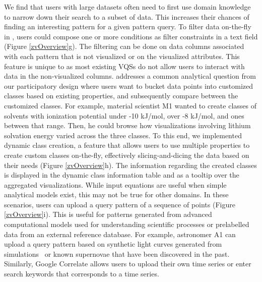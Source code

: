  We find that users with large datasets often need to first use domain knowledge to narrow down their search to a subset of data. This increases their chances of finding an interesting pattern for a given pattern query. To filter data on-the-fly in \zv, users could compose one or more conditions as filter constraints in a text field (Figure \ref{zvOverview}g). The filtering can be done on data columns associated with each pattern that is not visualized or on the visualized attributes. This feature is unique to \zv as most existing VQSs do not allow users to interact with data in the non-visualized columns.
 addresses a common analytical question from our participatory design where users want to bucket data points into customized classes based on existing properties, and subsequently compare between the customized classes. For example, material scientist M1 wanted to create classes of solvents with ionization potential under -10 kJ/mol, over -8 kJ/mol, and ones between that range. Then, he could browse how visualizations involving lithium solvation energy varied across the three classes. To this end, we implemented dynamic class creation, a feature that allows users to use multiple properties to create custom classes on-the-fly, effectively slicing-and-dicing the data based on their needs (Figure \ref{zvOverview}h). The information regarding the created classes is displayed in the dynamic class information table and as a tooltip over the aggregated visualizations.
 While input equations are useful when simple analytical models exist, this may not be true for other domains. In these scenarios, users can upload a query pattern of a sequence of points (Figure \ref{zvOverview}i). This is useful for patterns generated from advanced computational models used for understanding scientific processes or prelabelled data from an external reference database. For example, astronomer A1 can upload a query pattern based on synthetic light curves generated from simulations~\cite{Nugent1997} or known supernovae that have been discovered in the past. Similarly, Google Correlate allows users to upload their own time series or enter search keywords that corresponds to a time series.
